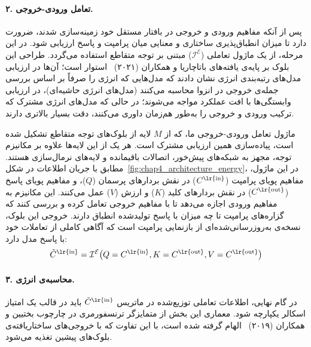 \paragraph{۲. تعامل ورودی-خروجی.}
پس از آنکه مفاهیم ورودی و خروجی در بافتار مستقل خود زمینه‌سازی شدند، ضرورت دارد تا میزان انطباق‌پذیری ساختاری و معنایی میان پرامپت و پاسخ ارزیابی شود. در این مرحله، از یک ماژول تعاملی ($\mathcal{I}^{\mathcal{E}}$) مبتنی بر توجه متقاطع استفاده می‌گردد. طراحی این بلوک بر پایه‌ی یافته‌های باتاچاریا و همکاران (۲۰۲۱)~\cite{bhattacharyya2021reranking} استوار است؛ آن‌ها در ارزیابی مدل‌های رتبه‌بندی انرژی نشان دادند که مدل‌هایی که انرژی را صرفاً بر اساس بررسی جمله‌ی خروجی در انزوا محاسبه می‌کنند (مدل‌های انرژی حاشیه‌ای)، در ارزیابی وابستگی‌ها با افت عملکرد مواجه می‌شوند؛ در حالی که مدل‌های انرژی مشترک که ترکیب ورودی و خروجی را به‌طور هم‌زمان داوری می‌کنند، دقت بسیار بالاتری دارند.

ماژول تعامل ورودی-خروجی ما، که از $M$ لایه از بلوک‌های توجه متقاطع تشکیل شده است، پیاده‌سازی همین ارزیابی مشترک است. هر یک از این لایه‌ها علاوه بر مکانیزم توجه، مجهز به شبکه‌های پیش‌خور، اتصالات باقیمانده و لایه‌های نرمال‌سازی هستند. مطابق با جریان اطلاعات در شکل~\ref{fig:chap4_architecture_energy}، در این ماژول، مفاهیم پویای پرامپت ($C^{\text{\lr{in}}}$) در نقش بردارهای پرسمان ($Q$)، و مفاهیم پویای پاسخ ($C^{\text{\lr{out}}}$) در نقش بردارهای کلید ($K$) و ارزش ($V$) عمل می‌کنند. این مکانیزم به مفاهیم ورودی اجازه می‌دهد تا با مفاهیم خروجی تعامل کرده و بررسی کنند که گزاره‌های پرامپت تا چه میزان با پاسخ تولیدشده انطباق دارند. خروجی این بلوک، نسخه‌ی به‌روزرسانی‌شده‌ای از بازنمایی پرامپت است که آگاهی کاملی از تعاملات خود با پاسخ مدل دارد:
\begin{equation}\label{eq:chap4_cross_attention_interaction}
    \tilde{C}^{\text{\lr{in}}} = \mathcal{I}^{\mathcal{E}}\big(Q=C^{\text{\lr{in}}}, K=C^{\text{\lr{out}}}, V=C^{\text{\lr{out}}}\big)
\end{equation}

\paragraph{۳. محاسبه‌ی انرژی.}
در گام نهایی، اطلاعات تعاملی توزیع‌شده در ماتریس $\tilde{C}^{\text{\lr{in}}}$ باید در قالب یک امتیاز اسکالر یکپارچه شود. معماری این بخش از متمایزگر ترنسفورمری در چارچوب  بختیین و همکاران (۲۰۱۹)~\cite{bakhtin2019realfake} الهام گرفته شده است، با این تفاوت که با خروجی‌های ساختاریافته‌ی بلوک‌های پیشین تغذیه می‌شود.

